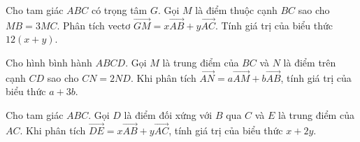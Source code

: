 \begin{bt}%
	Cho tam giác $ABC$ có trọng tâm $G$. Gọi $M$ là điểm thuộc cạnh $BC$ sao cho $MB=3MC$. Phân tích vectơ $\overrightarrow{GM}=x\overrightarrow{AB}+y\overrightarrow{AC}$. Tính giá trị của biểu thức $12(x+y)$.
\end{bt}

\begin{bt}%
	Cho hình bình hành $ABCD$. Gọi $M$ là trung điểm của $BC$ và $N$ là điểm trên cạnh $CD$ sao cho $CN=2ND$. Khi phân tích $\overrightarrow{AN}=a\overrightarrow{AM}+b\overrightarrow{AB}$, tính giá trị của biểu thức $a+3b$.
\end{bt}

\begin{bt}%
	Cho tam giác $ABC$. Gọi $D$ là điểm đối xứng với $B$ qua $C$ và $E$ là trung điểm của $AC$. Khi phân tích $\overrightarrow{DE}=x\overrightarrow{AB}+y\overrightarrow{AC}$, tính giá trị của biểu thức $x+2y$.
\end{bt}


